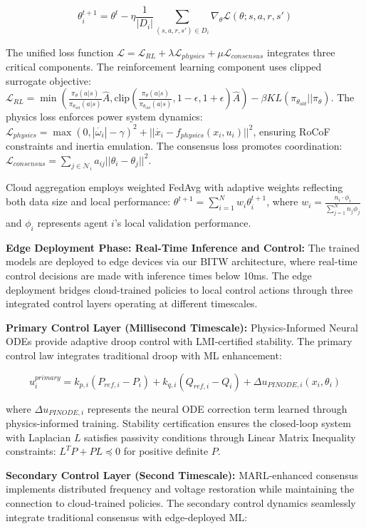 \documentclass[12pt]{article}
\begin{document}
$$\theta_i^{t+1} = \theta^t - \eta \frac{1}{|D_i|} \sum_{(s,a,r,s') \in D_i} \nabla_{\theta} \mathcal{L}(\theta; s, a, r, s')$$

The unified loss function $\mathcal{L} = \mathcal{L}_{RL} + \lambda \mathcal{L}_{physics} + \mu \mathcal{L}_{consensus}$ integrates three critical components. The reinforcement learning component uses clipped surrogate objective: $\mathcal{L}_{RL} = \min\left(\frac{\pi_{\theta}(a|s)}{\pi_{\theta_{old}}(a|s)} \hat{A}, \text{clip}\left(\frac{\pi_{\theta}(a|s)}{\pi_{\theta_{old}}(a|s)}, 1-\epsilon, 1+\epsilon\right) \hat{A}\right) - \beta KL(\pi_{\theta_{old}} || \pi_{\theta})$. The physics loss enforces power system dynamics: $\mathcal{L}_{physics} = \max(0, |\dot{\omega_i}| - \gamma)^2 + ||\dot{x_i} - f_{physics}(x_i, u_i)||^2$, ensuring RoCoF constraints and inertia emulation. The consensus loss promotes coordination: $\mathcal{L}_{consensus} = \sum_{j \in \mathcal{N}_i} a_{ij} ||\theta_i - \theta_j||^2$.

Cloud aggregation employs weighted FedAvg with adaptive weights reflecting both data size and local performance: $\theta^{t+1} = \sum_{i=1}^N w_i \theta_i^{t+1}$, where $w_i = \frac{n_i \cdot \phi_i}{\sum_{j=1}^N n_j \phi_j}$ and $\phi_i$ represents agent $i$'s local validation performance.

\textbf{Edge Deployment Phase: Real-Time Inference and Control:} The trained models are deployed to edge devices via our BITW architecture, where real-time control decisions are made with inference times below 10ms. The edge deployment bridges cloud-trained policies to local control actions through three integrated control layers operating at different timescales.

\textbf{Primary Control Layer (Millisecond Timescale):} Physics-Informed Neural ODEs provide adaptive droop control with LMI-certified stability. The primary control law integrates traditional droop with ML enhancement:

$$u_i^{primary} = k_{p,i}(P_{ref,i} - P_i) + k_{q,i}(Q_{ref,i} - Q_i) + \Delta u_{PINODE,i}(x_i, \theta_i)$$

where $\Delta u_{PINODE,i}$ represents the neural ODE correction term learned through physics-informed training. Stability certification ensures the closed-loop system with Laplacian $L$ satisfies passivity conditions through Linear Matrix Inequality constraints: $L^T P + PL \preceq 0$ for positive definite $P$.

\textbf{Secondary Control Layer (Second Timescale):} MARL-enhanced consensus implements distributed frequency and voltage restoration while maintaining the connection to cloud-trained policies. The secondary control dynamics seamlessly integrate traditional consensus with edge-deployed ML:
\end{document}

